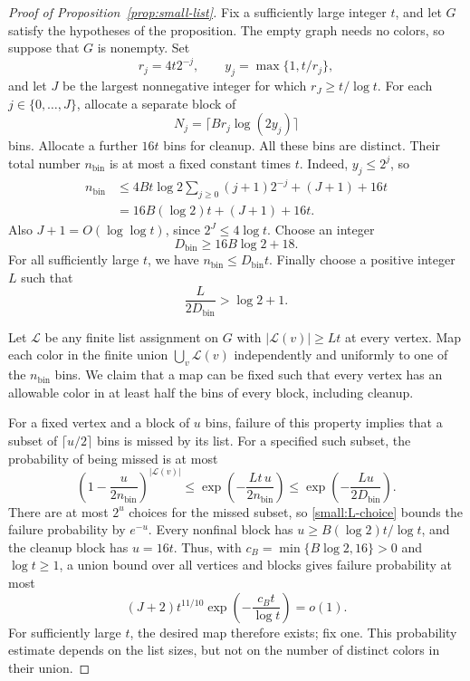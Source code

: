 \begin{proof}[Proof of Proposition~\ref{prop:small-list}]
Fix a sufficiently large integer $t$, and let $G$ satisfy the hypotheses
of the proposition. The empty graph needs no colors, so suppose that
$G$ is nonempty. Set
\[
 r_j=4t2^{-j},\qquad y_j=\max\{1,t/r_j\},
\]
and let $J$ be the largest nonnegative integer for which
$r_J\ge t/\log t$. For each $j\in\{0,\ldots,J\}$, allocate a separate
block of
\[
 N_j=\lceil Br_j\log(2y_j)\rceil
\]
bins. Allocate a further $16t$ bins for cleanup. All these bins are
distinct. Their total number $n_{\mathrm{bin}}$ is at most a fixed
constant times $t$. Indeed, $y_j\le2^j$, so
\begin{align*}
 n_{\mathrm{bin}}
 &\le4Bt\log2\sum_{j\ge0}(j+1)2^{-j}+(J+1)+16t\\
 &=16B(\log2)t+(J+1)+16t.
\end{align*}
Also $J+1=O(\log\log t)$, since $2^J\le4\log t$.
Choose an integer
\[
 D_{\mathrm{bin}}\ge16B\log2+18.
\]
For all sufficiently large $t$, we have
$n_{\mathrm{bin}}\le D_{\mathrm{bin}}t$.
Finally choose a positive integer $L$ such that
\begin{equation}\label{small:L-choice}
 \frac{L}{2D_{\mathrm{bin}}}>\log2+1.
\end{equation}

Let $\mathcal L$ be any finite list assignment on $G$ with
$|\mathcal L(v)|\ge Lt$ at every vertex. Map each color in the finite
union $\bigcup_v\mathcal L(v)$ independently and uniformly to one of
the $n_{\mathrm{bin}}$ bins. We claim that a map can be fixed such that
every vertex has an allowable color in at least half the bins of
every block, including cleanup.

For a fixed vertex and a block of $u$ bins, failure of this property
implies that a subset of $\lceil u/2\rceil$ bins is missed by its list.
For a specified such subset, the probability of being missed is at most
\[
 \left(1-\frac{u}{2n_{\mathrm{bin}}}\right)^{|\mathcal L(v)|}
 \le\exp\left(-\frac{Lt\,u}{2n_{\mathrm{bin}}}\right)
 \le\exp\left(-\frac{Lu}{2D_{\mathrm{bin}}}\right).
\]
There are at most $2^u$ choices for the missed subset, so
\eqref{small:L-choice} bounds the failure probability by $e^{-u}$.
Every nonfinal block has
$u\ge B(\log2)t/\log t$, and the cleanup block has $u=16t$.
Thus, with $c_B=\min\{B\log2,16\}>0$ and $\log t\ge1$, a union bound
over all vertices and blocks gives failure probability at most
\[
 (J+2)t^{11/10}\exp\left(-\frac{c_Bt}{\log t}\right)=o(1).
\]
For sufficiently large $t$, the desired map therefore exists; fix one.
This probability estimate depends on the list sizes, but not on the
number of distinct colors in their union.


\end{proof}

